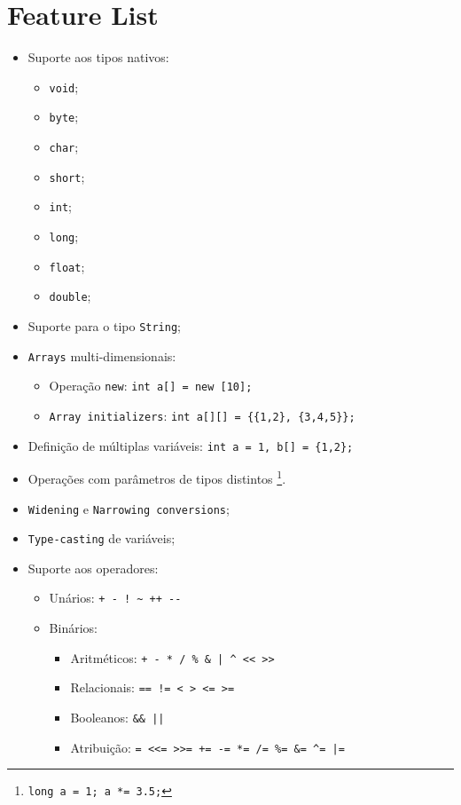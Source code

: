 \documentclass[a4paper]{article}
\begin{document}
\section{Feature List}
\begin{itemize}
	\item Suporte aos tipos nativos:
	\begin{itemize}
		\item \texttt{void};
		\item \texttt{byte};
		\item \texttt{char};
		\item \texttt{short};
		\item \texttt{int};
		\item \texttt{long};
		\item \texttt{float};
		\item \texttt{double};
	\end{itemize}
	\item Suporte para o tipo \texttt{String};%
	\item \texttt{Arrays} multi-dimensionais:
	\begin{itemize}
		\item Operação \texttt{new}: \quad \texttt{int a[] = new [10];}
		\item \texttt{Array initializers}: \quad \texttt{int a[][] = \{\{1,2\}, \{3,4,5\}\}; }
	\end{itemize}
	\item Definição de múltiplas variáveis: \quad \texttt{int a = 1, b[] = \{1,2\}; }
	\item Operações com parâmetros de tipos distintos \footnote[1]{\texttt{long a = 1; a *= 3.5;}}.
	\item \texttt{Widening} e \texttt{Narrowing conversions};
	\item \texttt{Type-casting} de variáveis;
	\item Suporte aos operadores:
	\begin{itemize}
		\item Unários: \quad \verb|+ - ! ~ ++ --|
		\item Binários:
		\begin{itemize}
			\item Aritméticos: \quad \verb!+ - * / % & | ^ << >>!
			\item Relacionais: \quad \verb|== != < > <= >=|
			\item Booleanos: \quad \verb!&& ||!
			\item Atribuição: \quad \verb!= <<= >>= += -= *= /= %= &= ^= |=!

\end{itemize}
\end{itemize}
\end{itemize}
\end{document}
